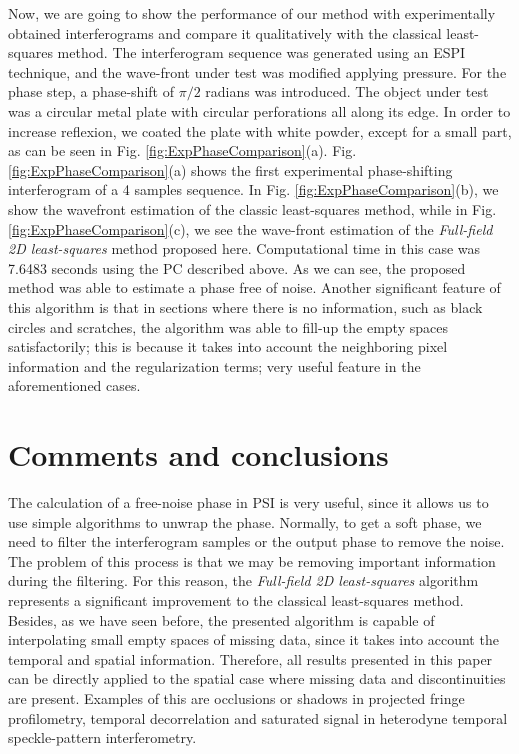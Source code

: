 Now, we are going to show the performance of our method with experimentally 
obtained interferograms and compare it qualitatively with the classical 
least-squares method. The interferogram sequence was generated using an ESPI 
technique, and the wave-front under test was modified applying pressure. For 
the phase step, a phase-shift of $\pi/2$ radians was introduced. The object
under test was a circular metal plate with circular perforations all along
its edge. In order to increase reflexion, we coated the plate with white
powder, except for a small part, as can be seen in Fig.
\ref{fig:ExpPhaseComparison}(a). Fig. \ref{fig:ExpPhaseComparison}(a) shows the
first experimental phase-shifting interferogram of a 4 samples sequence. In
Fig. \ref{fig:ExpPhaseComparison}(b), we show the wavefront estimation of the 
classic least-squares method, while in Fig. \ref{fig:ExpPhaseComparison}(c), we 
see the wave-front estimation of the \textit{Full-field 2D least-squares} 
method proposed here. Computational time in this case was 7.6483 seconds
using the PC described above. As we can see, the proposed method was able to
estimate a phase free of noise. Another significant feature of this algorithm is
that in sections where there is no information, such as black circles and
scratches, the algorithm was able to fill-up the empty spaces satisfactorily;
this is because it takes into account the neighboring pixel information and the
regularization terms; very useful feature in the aforementioned cases.

\section{Comments and conclusions}

The calculation of a free-noise phase in PSI is very useful, since it allows 
us to use simple algorithms to unwrap the phase. Normally, to get a soft phase, 
we need to filter the interferogram samples or the output phase to 
remove the noise. The problem of this process is that we may be removing 
important information during the filtering. For this reason, the 
\textit{Full-field 2D least-squares} algorithm represents a significant 
improvement to the classical least-squares method. Besides, as we have seen
before, the presented algorithm is capable of interpolating small empty spaces
of missing data, since it takes into account the temporal and spatial
information. Therefore, all results presented in this paper can be directly
applied to the spatial case where missing data and discontinuities are present.
Examples of this are occlusions or shadows in projected fringe profilometry,
temporal decorrelation and saturated signal in heterodyne temporal
speckle-pattern interferometry.

